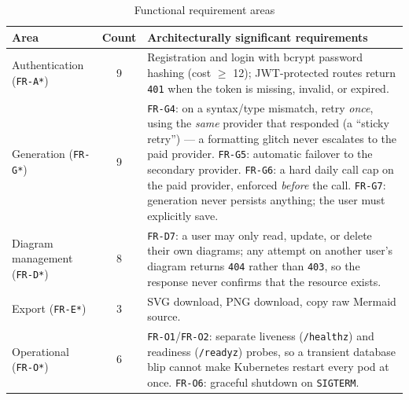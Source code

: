 \documentclass[11pt,a4paper]{article}
\newcommand{\reqid}[1]{\texttt{#1}}
\begin{document}
\begin{table}[H]
\centering
\begin{tabularx}{\textwidth}{@{}L{3.3cm} c Y@{}}
\toprule
\textbf{Area} & \textbf{Count} & \textbf{Architecturally significant requirements} \\
\midrule
Authentication \newline (\reqid{FR-A*}) & 9 &
    Registration and login with bcrypt password hashing (cost $\geq$ 12);
    JWT-protected routes return \texttt{401} when the token is missing,
    invalid, or expired. \\
Generation \newline (\reqid{FR-G*}) & 9 &
    \reqid{FR-G4}: on a syntax/type mismatch, retry \emph{once}, using the
    \emph{same} provider that responded (a ``sticky retry'') --- a
    formatting glitch never escalates to the paid provider.
    \reqid{FR-G5}: automatic failover to the secondary provider.
    \reqid{FR-G6}: a hard daily call cap on the paid provider, enforced
    \emph{before} the call. \reqid{FR-G7}: generation never persists
    anything; the user must explicitly save. \\
Diagram management \newline (\reqid{FR-D*}) & 8 &
    \reqid{FR-D7}: a user may only read, update, or delete their own
    diagrams; any attempt on another user's diagram returns \texttt{404}
    rather than \texttt{403}, so the response never confirms that the
    resource exists. \\
Export \newline (\reqid{FR-E*}) & 3 &
    SVG download, PNG download, copy raw Mermaid source. \\
Operational \newline (\reqid{FR-O*}) & 6 &
    \reqid{FR-O1}/\reqid{FR-O2}: separate liveness (\texttt{/healthz}) and
    readiness (\texttt{/readyz}) probes, so a transient database blip
    cannot make Kubernetes restart every pod at once.
    \reqid{FR-O6}: graceful shutdown on \texttt{SIGTERM}. \\
\bottomrule
\end{tabularx}
\caption{Functional requirement areas}
\label{tab:fr-summary}
\end{table}
\end{document}
